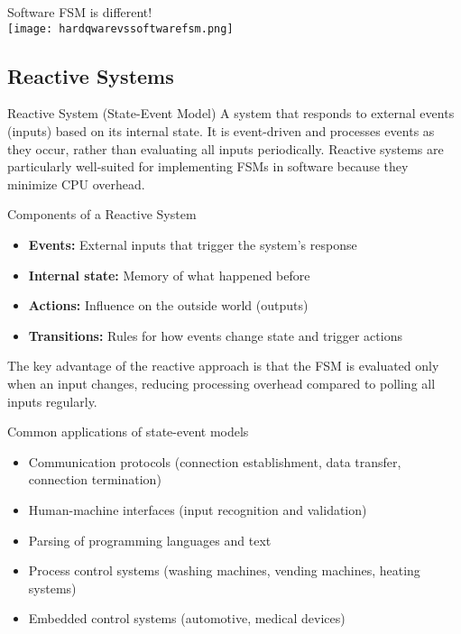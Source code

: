 \begin{concept}{Software FSM is different!}\\
\texttt{[image: hardqwarevssoftwarefsm.png]}
\end{concept}

\subsection{Reactive Systems}

\begin{definition}{Reactive System (State-Event Model)}
A system that responds to external events (inputs) based on its internal state. It is event-driven and processes events as they occur, rather than evaluating all inputs periodically. Reactive systems are particularly well-suited for implementing FSMs in software because they minimize CPU overhead.
\end{definition}

\begin{concept}{Components of a Reactive System}
\begin{itemize}
    \item \textbf{Events:} External inputs that trigger the system's response
    \item \textbf{Internal state:} Memory of what happened before
    \item \textbf{Actions:} Influence on the outside world (outputs)
    \item \textbf{Transitions:} Rules for how events change state and trigger actions
\end{itemize}

The key advantage of the reactive approach is that the FSM is evaluated only when an input changes, reducing processing overhead compared to polling all inputs regularly.
\end{concept}

\begin{example2}
{Common applications of state-event models}
\begin{itemize}
    \item Communication protocols (connection establishment, data transfer, connection termination)
    \item Human-machine interfaces (input recognition and validation)
    \item Parsing of programming languages and text
    \item Process control systems (washing machines, vending machines, heating systems)
    \item Embedded control systems (automotive, medical devices)
\end{itemize}
\end{example2}

